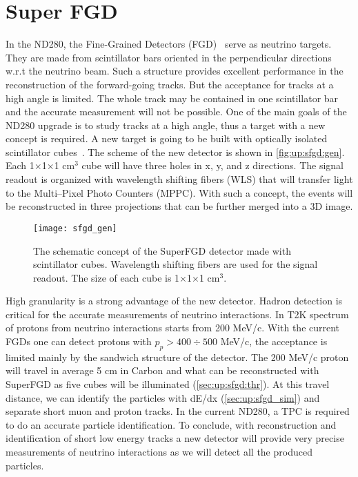 \documentclass[main.tex]{subfiles}
\begin{document}
\renewcommand{\labelitemi}{\ding{226}}
\renewcommand{\labelitemii}{\ding{227}}

\newcommand{\sfgdx}{192}
\newcommand{\sfgdz}{184}
\newcommand{\sfgdy}{56}

\chapter{Super FGD}
\label{ch:up:sfgd}
In the ND280, the Fine-Grained Detectors (FGD)~\cite{Amaudruz2012} serve as neutrino targets. They are made from scintillator bars oriented in the perpendicular directions w.r.t the neutrino beam. Such a structure provides excellent performance in the reconstruction of the forward-going tracks. But the acceptance for tracks at a high angle is limited. The whole track may be contained in one scintillator bar and the accurate measurement will not be possible. One of the main goals of the ND280 upgrade is to study tracks at a high angle, thus a target with a new concept is required. A new target is going to be built with optically isolated scintillator cubes~\cite{Blondel2018}. The scheme of the new detector is shown in \autoref{fig:up:sfgd:gen}. Each 1$\times$1$\times$1 $\text{cm}^3$ cube will have three holes in x, y, and z directions. The signal readout is organized with wavelength shifting fibers (WLS) that will transfer light to the Multi--Pixel Photo Counters (MPPC). With such a concept, the events will be reconstructed in three projections that can be further merged into a 3D image.

\begin{figure}[!ht]
	\centering
	\texttt{[image: sfgd\_gen]}
	\caption{The schematic concept of the SuperFGD detector made with scintillator cubes. Wavelength shifting fibers are used for the signal readout. The size of each cube is 1$\times$1$\times$1 $\text{cm}^3$.}
	\label{fig:up:sfgd:gen}
\end{figure}
High granularity is a strong advantage of the new detector. Hadron detection is critical for the accurate measurements of neutrino interactions. In T2K spectrum of protons from neutrino interactions starts from 200 MeV/c. With the current FGDs one can detect protons with $p_p > 400 \div 500 $ MeV/c, the acceptance is limited mainly by the sandwich structure of the detector. The 200 MeV/c proton will travel in average 5 cm in Carbon and what can be reconstructed with SuperFGD as five cubes will be illuminated (\autoref{sec:up:sfgd:thr}). At this travel distance, we can identify the particles with dE/dx (\autoref{sec:up:sfgd_sim}) and separate short muon and proton tracks. In the current ND280, a TPC is required to do an accurate particle identification. To conclude, with reconstruction and identification of short low energy tracks a new detector will provide very precise measurements of neutrino interactions as we will detect all the produced particles.
\end{document}
